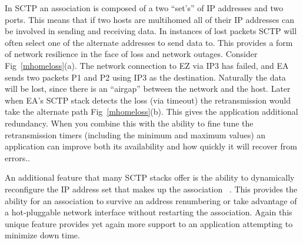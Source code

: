 \documentclass[conference]{IEEEtran}
\begin{document}
In SCTP an association is composed of a two ``set's'' of IP addresses and two ports. This
means that if two hosts are multihomed all of their IP addresses can be involved
in sending and receiving data. In instances of lost packets SCTP will often select
one of the alternate addresses to send data to. This provides a form of network 
resilience in the face of loss and network outages. Consider Fig~\ref{mhomeloss}(a).
The network connection to EZ via IP3 has failed, and EA sends two packets P1 and P2 using
IP3 as the destination. Naturally the data will be lost, since there is an ``airgap''
between the network and the host. Later when EA's SCTP stack detects the loss (via timeout)
the retransmission would take the alternate path Fig~\ref{mhomeloss}(b). This gives
the application additional redundancy. When you combine this with the ability to fine tune
the retransmission timers (including the minimum and maximum values) an 
application can improve both its availability and how quickly it will recover from
errors..

An additional feature that many SCTP stacks offer is the ability to dynamically 
reconfigure the IP address set that makes up the association ~\cite{rfc5061}. This
provides the ability for an association to survive an address renumbering or take
advantage of a hot-pluggable network interface without restarting the 
association. Again this unique feature provides yet again more support 
to an application attempting to minimize down time.
\end{document}
